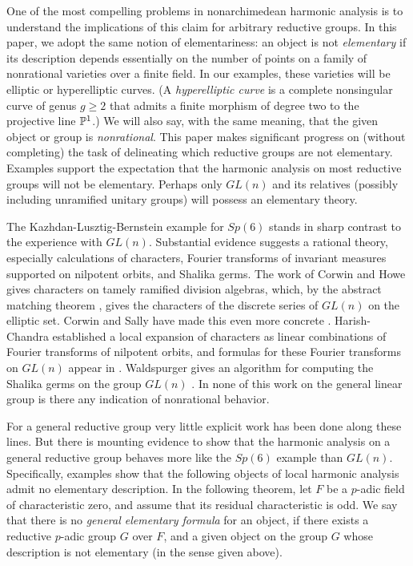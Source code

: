 One of the most compelling problems in nonarchimedean harmonic analysis
is to understand the implications of this
claim for arbitrary reductive groups.   In this 
paper, we adopt the same notion of elementariness: an object is
not {\it elementary\/} if its description depends essentially
on the number of points on a family of nonrational
varieties over a finite field.  In our examples, these varieties will be
elliptic or hyperelliptic curves.  (A {\it hyperelliptic curve} is a complete
nonsingular curve of genus $g\ge 2$ that admits a finite morphism
of degree two to the projective line $\P^1$.)
We will also say, with the same
meaning, that 
the given object or group is {\it nonrational}.
This paper makes significant progress on (without completing)
the task of delineating which reductive groups are not elementary.
Examples support the expectation
that the harmonic analysis on most reductive groups will not be elementary.
Perhaps only $GL(n)$ 
and its relatives (possibly including unramified unitary groups) 
will possess an elementary theory.

The Kazhdan-Lusztig-Bernstein example for $Sp(6)$ stands in sharp contrast to the
experience with $GL(n)$.   
Substantial evidence
suggests a rational theory, especially calculations of characters,
Fourier transforms of invariant measures supported
on nilpotent orbits, and Shalika germs.  
The work of Corwin and Howe \cite{CH} gives characters on tamely
ramified division algebras, which, by the abstract matching
theorem \cite{BDKV}, gives the characters of the discrete series 
of $GL(n)$ on the
elliptic set.  Corwin and Sally 
have made this even more concrete \cite{CS}.
Harish-Chandra established a local expansion of characters as linear
combinations of
Fourier transforms of nilpotent orbits, and 
formulas for these Fourier transforms on
$GL(n)$ appear in \cite{Ho}.  
Waldspurger gives an algorithm for computing the Shalika germs
on the group $GL(n)$ \cite{W1}.  In none of this work on the general linear
group is there any indication
of nonrational behavior.

For a general reductive group very little explicit work
has been done along
these lines.  But there is mounting evidence to show
that the harmonic analysis on a general reductive group behaves
more like the $Sp(6)$ example than $GL(n)$.  Specifically, 
examples show that the following objects of local harmonic
analysis admit no elementary description.
In the following theorem, let $F$ be a $p$-adic
field of characteristic zero, and assume that its residual
characteristic is odd. We say that there is no {\it general elementary
formula\/} for an object, if there exists a reductive $p$-adic group $G$
over $F$, and a given object on the group $G$ whose description
is not elementary (in the sense given above).

